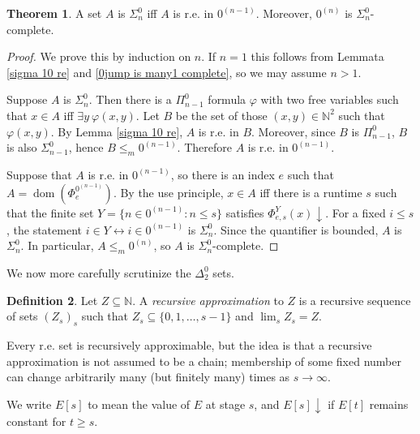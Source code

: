 \documentclass[12pt]{report}
\newcommand{\NN}{\mathbb{N}}
\newcommand{\halts}{\downarrow}
\renewcommand{\iff}{\leftrightarrow}
\DeclareMathOperator{\dom}{dom}
\newcommand{\dfn}[1]{\emph{#1}\index{#1}}
\theoremstyle{definition}
\newtheorem{theorem}{Theorem}[chapter]
\newtheorem{definition}[theorem]{Definition}
\begin{document}
\begin{theorem}
\label{sigman0 iff re in zero(n-1)jump}
A set $A$ is $\Sigma_n^0$ iff $A$ is r.e. in $0^{(n-1)}$. Moreover, $0^{(n)}$ is $\Sigma_n^0$-complete.
\end{theorem}
\begin{proof}
We prove this by induction on $n$. If $n = 1$ this follows from Lemmata \ref{sigma 10 re} and \ref{0jump is many1 complete}, so we may assume $n > 1$.

Suppose $A$ is $\Sigma_n^0$. Then there is a $\Pi_{n-1}^0$ formula $\varphi$ with two free variables such that $x \in A$ iff $\exists y~\varphi(x, y)$. Let $B$ be the set of those $(x, y) \in \NN^2$ such that $\varphi(x, y)$. By Lemma \ref{sigma 10 re}, $A$ is r.e. in $B$.
Moreover, since $B$ is $\Pi_{n-1}^0$, $B$ is also $\Sigma_{n-1}^0$, hence $B \leq_m 0^{(n-1)}$. Therefore $A$ is r.e. in $0^{(n-1)}$.

Suppose that $A$ is r.e. in $0^{(n-1)}$, so there is an index $e$ such that $A = \dom(\Phi_e^{0^{(n-1)}})$. By the use principle, $x \in A$ iff there is a runtime $s$ such that the finite set $Y = \{n \in 0^{(n-1)}: n \leq s\}$ satisfies $\Phi^Y_{e,s}(x) \halts$.
For a fixed $i \leq s$, the statement $i \in Y \iff i \in 0^{(n-1)}$ is $\Sigma_n^0$. Since the quantifier is bounded, $A$ is $\Sigma_n^0$. In particular, $A \leq_m 0^{(n)}$, so $A$ is $\Sigma_n^0$-complete.
\end{proof}

We now more carefully scrutinize the $\Delta_2^0$ sets.
\begin{definition}
Let $Z \subseteq \NN$. A \dfn{recursive approximation} to $Z$ is a recursive sequence of sets $(Z_s)_s$ such that $Z_s \subseteq \{0, 1, \dots, s - 1\}$ and $\lim_s Z_s = Z$.
\end{definition}
Every r.e. set is recursively approximable, but the idea is that a recursive approximation is not assumed to be a chain; membership of some fixed number can change arbitrarily many (but finitely many) times as $s \to \infty$.

We write $E[s]$ to mean the value of $E$ at stage $s$, and $E[s] \halts$ if $E[t]$ remains constant for $t \geq s$.
\end{document}
